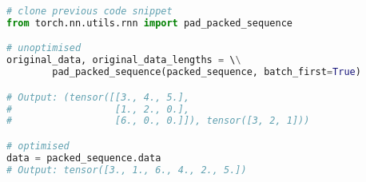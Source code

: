 \begin{appendices}
\begin{lstlisting}[language=Python]
# clone previous code snippet
from torch.nn.utils.rnn import pad_packed_sequence

# unoptimised
original_data, original_data_lengths = \\
        pad_packed_sequence(packed_sequence, batch_first=True)

# Output: (tensor([[3., 4., 5.],
#                  [1., 2., 0.],
#                  [6., 0., 0.]]), tensor([3, 2, 1]))

# optimised
data = packed_sequence.data
# Output: tensor([3., 1., 6., 4., 2., 5.])
\end{lstlisting}



\end{appendices}